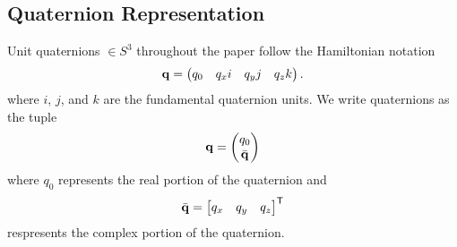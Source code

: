 
\subsection{Quaternion Representation}

Unit quaternions $\in S^3$ throughout the paper follow the Hamiltonian notation
\begin{equation}
  \q=\begin{pmatrix}q_{0} & q_{x}i & q_{y} j & q_{z} k \end{pmatrix}.%
\end{equation}
where $i$, $j$, and $k$ are the fundamental quaternion units.
We write quaternions as the tuple
\begin{equation}
	\boldsymbol{\mathrm{q}} = \begin{pmatrix} q_0 \\ \bar{\boldsymbol{\mathrm{q}}} \end{pmatrix}
\end{equation}
where $q_0$ represents the real portion of the quaternion and
\begin{equation}
	\bar{\boldsymbol{\mathrm{q}}} = \begin{bmatrix} q_x & q_y & q_z \end{bmatrix} ^{\mathsf{T}}
\end{equation}
respresents the complex portion of the quaternion.

